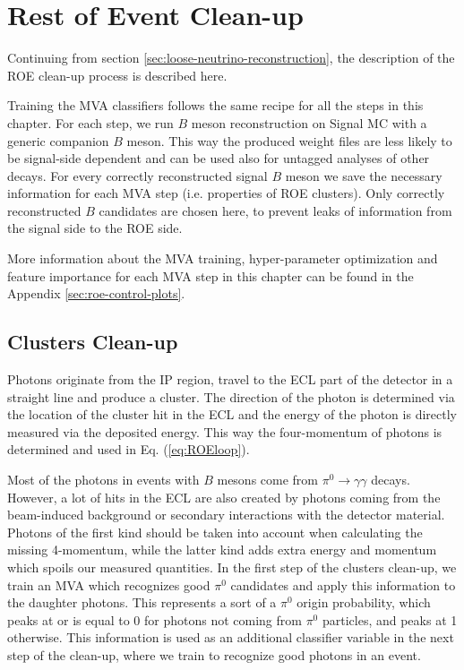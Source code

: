\chapter{Rest of Event Clean-up}
\label{sec:roe}

Continuing from section \ref{sec:loose-neutrino-reconstruction}, the description of the ROE clean-up process is described here. 

Training the MVA classifiers follows the same recipe for all the steps in this chapter. For each step, we run $B$ meson reconstruction on Signal MC with a generic companion $B$ meson. This way the produced weight files are less likely to be signal-side dependent and can be used also for untagged analyses of other decays. For every correctly reconstructed signal $B$ meson we save the necessary information for each MVA step (i.e. properties of ROE clusters). Only correctly reconstructed $B$ candidates are chosen here, to prevent leaks of information from the signal side to the ROE side.

More information about the MVA training, hyper-parameter optimization and feature importance for each MVA step in this chapter can be found in the Appendix \ref{sec:roe-control-plots}.

\section{Clusters Clean-up}

Photons originate from the IP region, travel to the ECL part of the detector in a straight line and produce a cluster. The direction of the photon is determined via the location of the cluster hit in the ECL and the energy of the photon is directly measured via the deposited energy. This way the four-momentum of photons is determined and used in Eq. (\ref{eq:ROEloop}).

Most of the photons in events with $B$ mesons come from $\pi^0 \to \gamma \gamma$ decays. However, a lot of hits in the ECL are also created by photons coming from the beam-induced background or secondary interactions with the detector material. Photons of the first kind should be taken into account when calculating the missing 4-momentum, while the latter kind adds extra energy and momentum which spoils our measured quantities. In the first step of the clusters clean-up, we train an MVA which recognizes good $\pi^0$ candidates and apply this information to the daughter photons. This represents a sort of a $\pi^0$ origin probability, which peaks at or is equal to 0 for photons not coming from $\pi^0$ particles, and peaks at 1 otherwise. This information is used as an additional classifier variable in the next step of the clean-up, where we train to recognize good photons in an event.


